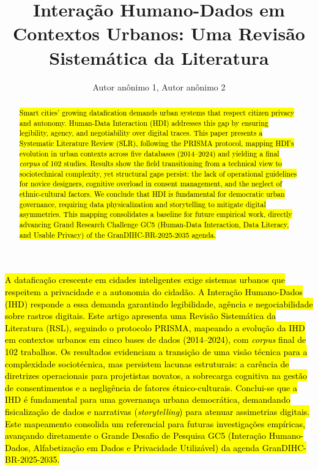 \documentclass[12pt]{article}
\title{Interação Humano-Dados em Contextos Urbanos: Uma Revisão Sistemática da Literatura} %
\author{Autor anônimo 1, Autor anônimo 2}
\begin{document}
 


\maketitle

\thispagestyle{plain}

\begin{abstract}{
\hl{Smart cities' growing datafication demands urban systems that respect citizen privacy and autonomy. Human-Data Interaction (HDI) addresses this gap by ensuring legibility, agency, and negotiability over digital traces. This paper presents a Systematic Literature Review (SLR), following the PRISMA protocol, mapping HDI's evolution in urban contexts across five databases (2014--2024) and yielding a final \textit{corpus} of 102 studies. Results show the field transitioning from a technical view to sociotechnical complexity, yet structural gaps persist: the lack of operational guidelines for novice designers, cognitive overload in consent management, and the neglect of ethnic-cultural factors. We conclude that HDI is fundamental for democratic urban governance, requiring data physicalization and storytelling to mitigate digital asymmetries. This mapping consolidates a baseline for future empirical work, directly advancing Grand Research Challenge GC5 (Human-Data Interaction, Data Literacy, and Usable Privacy) of the GranDIHC-BR-2025-2035 agenda.}}
\end{abstract}

     

\begin{resumo}{
  \hl{A dataficação crescente em cidades inteligentes exige sistemas urbanos que respeitem a privacidade e a autonomia do cidadão. A Interação Humano-Dados (IHD) responde a essa demanda garantindo legibilidade, agência e negociabilidade sobre rastros digitais. Este artigo apresenta uma Revisão Sistemática da Literatura (RSL), seguindo o protocolo PRISMA, mapeando a evolução da IHD em contextos urbanos em cinco bases de dados (2014--2024), com \textit{corpus} final de 102 trabalhos. Os resultados evidenciam a transição de uma visão técnica para a complexidade sociotécnica, mas persistem lacunas estruturais: a carência de diretrizes operacionais para projetistas novatos, a sobrecarga cognitiva na gestão de consentimentos e a negligência de fatores étnico-culturais. Conclui-se que a IHD é fundamental para uma governança urbana democrática, demandando fisicalização de dados e narrativas (\textit{storytelling}) para atenuar assimetrias digitais. Este mapeamento consolida um referencial para futuras investigações empíricas, avançando diretamente o Grande Desafio de Pesquisa GC5 (Interação Humano-Dados, Alfabetização em Dados e Privacidade Utilizável) da agenda GranDIHC-BR-2025-2035.}}
\end{resumo}
\end{document}
